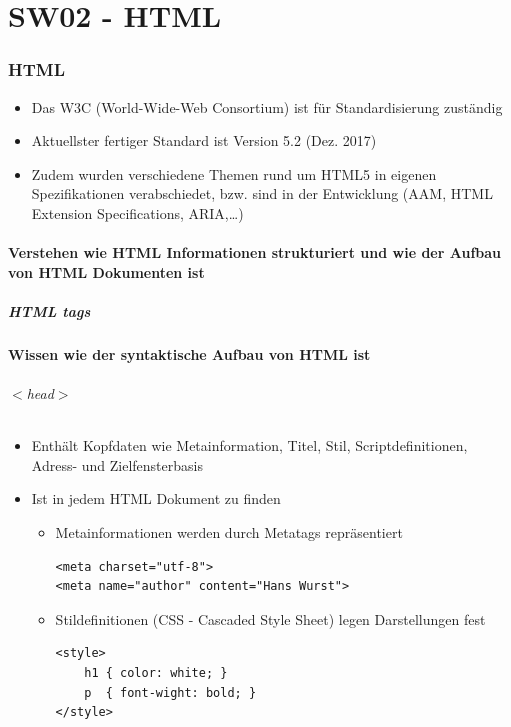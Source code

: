 \part{SW02 - HTML}
\section{HTML}
\begin{itemize}[noitemsep,topsep=0pt,leftmargin=*]
    \item Das W3C (World-Wide-Web Consortium) ist für Standardisierung zuständig
    \item Aktuellster fertiger Standard ist Version 5.2 (Dez. 2017)
    \item Zudem wurden verschiedene Themen rund um HTML5 in eigenen Spezifikationen verabschiedet, bzw. sind in der Entwicklung (AAM, HTML Extension Specifications, ARIA,\dots)
\end{itemize}
\subsection{Verstehen wie HTML Informationen strukturiert und wie der Aufbau von HTML Dokumenten ist}
\subsubsection{HTML tags}

\subsection{Wissen wie der \textbf{syntaktische Aufbau} von HTML ist}
\paragraph{$<$head$>$ }
\begin{itemize}[noitemsep,topsep=0pt,leftmargin=*]
    \item Enthält Kopfdaten wie Metainformation, Titel, Stil, Scriptdefinitionen, Adress- und Zielfensterbasis
    \item Ist in jedem HTML Dokument zu finden
    \begin{itemize}[noitemsep,topsep=0pt,leftmargin=*]
        \item Metainformationen werden durch Metatags repräsentiert
        \lstset{language=HTML}
        \begin{lstlisting}
<meta charset="utf-8">
<meta name="author" content="Hans Wurst">
        \end{lstlisting}
        \item Stildefinitionen (CSS - Cascaded Style Sheet) legen Darstellungen fest
        \begin{lstlisting}
<style>
    h1 { color: white; }
    p  { font-wight: bold; }
</style>
        \end{lstlisting}
    \end{itemize}
\end{itemize}


